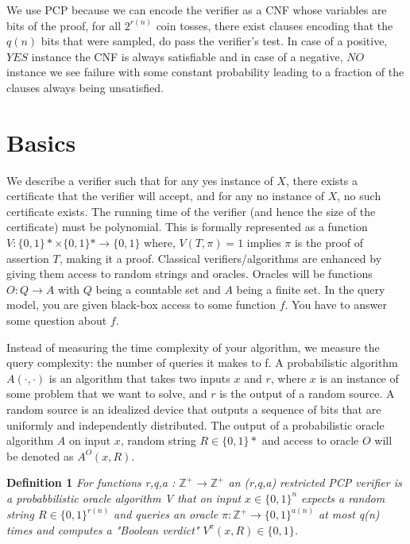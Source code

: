 We use PCP because we can encode the verifier as a CNF whose variables are bits of the proof, for all $2^{r(n)}$ coin tosses, there exist clauses encoding that the $q(n)$ bits that were sampled, do pass the verifier's test. In case of a positive, $YES$ instance the CNF is always satisfiable and in case of a negative, $NO$ instance we see failure with some constant probability leading to a fraction of the clauses always being unsatisfied. 


\section{Basics}
We describe a verifier such that for any yes instance of $X$, there exists a certificate that the verifier will accept, and for any no instance of $X$, no such certificate exists. The running time of the verifier (and hence the size of the certificate) must be polynomial. This is formally represented as a function $V: \{0,1\}* \times \{0,1\}* \rightarrow \{0,1\}$ where, $V(T,\pi) = 1$ implies $\pi$ is the proof of assertion $T$, making it a proof. Classical verifiers/algorithms are enhanced by giving them access to random strings and oracles. Oracles will be functions $O: Q \rightarrow A$ with $Q$ being a countable set and $A$ being a finite set. In the query model, you are given
black-box access to some function $f$. You have to answer some question about $f$. 

Instead of measuring the time complexity of your algorithm, we measure the query complexity: the number of queries it makes to f. A probabilistic algorithm $A(·, ·)$ is an algorithm that takes two inputs $x$ and $r$, where $x$ is an instance of some problem that we want to solve, and $r$ is the output of a random source. A random source is an idealized device that outputs a sequence of bits that are uniformly and independently distributed. The output of a probabilistic oracle algorithm $A$ on input $x$, random string $R \in \{0,1\}*$ and access to oracle $O$ will be denoted as $A^O(x,R)$.

\textbf{Definition 1} \textit{For functions r,q,a : $\mathbb{Z}^+ \rightarrow \mathbb{Z}^+$ an (r,q,a) restricted PCP verifier is a probabbilistic oracle algorithm V that on input $x \in \{0,1\}^n$ expects a random string $R \in \{0,1\}^{r(n)}$ and queries an oracle $\pi : \mathbb{Z}^+ \rightarrow \{0,1\}^{a(n)}$ at most q(n) times and computes a "Boolean verdict" $V^{\pi}(x,R) \in \{0,1\}$.}

